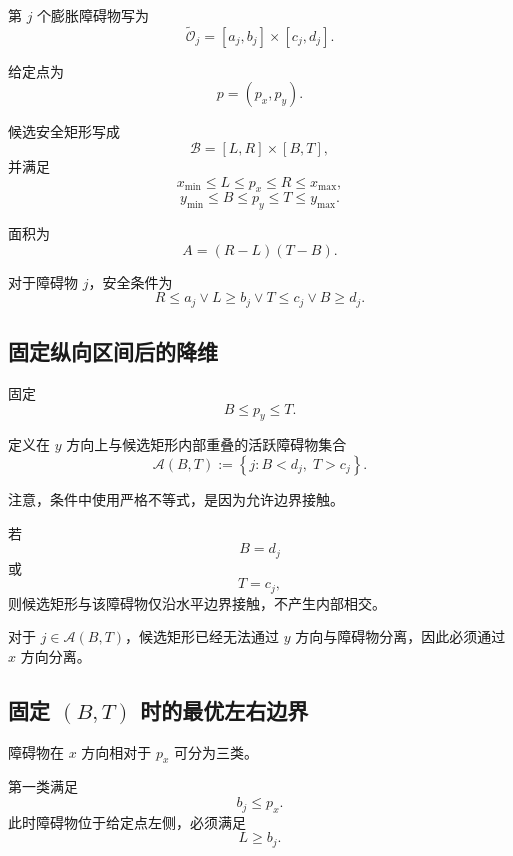 \documentclass[UTF8,12pt,a4paper]{ctexart}
\begin{document}
第 $j$ 个膨胀障碍物写为
\begin{equation}
    \widetilde{\mathcal O}_j
    =
    [a_j,b_j]\times[c_j,d_j].
\end{equation}

给定点为
\[
p=(p_x,p_y).
\]

候选安全矩形写成
\begin{equation}
    \mathcal B
    =
    [L,R]\times[B,T],
\end{equation}
并满足
\begin{equation}
    x_{\min}\le L\le p_x\le R\le x_{\max},
\end{equation}
\begin{equation}
    y_{\min}\le B\le p_y\le T\le y_{\max}.
\end{equation}

面积为
\begin{equation}
    A=(R-L)(T-B).
\end{equation}

对于障碍物 $j$，安全条件为
\begin{equation}
    R\le a_j
    \lor
    L\ge b_j
    \lor
    T\le c_j
    \lor
    B\ge d_j.
\end{equation}

\subsection{固定纵向区间后的降维}

固定
\[
B\le p_y\le T.
\]

定义在 $y$ 方向上与候选矩形内部重叠的活跃障碍物集合
\begin{equation}
    \mathcal A(B,T)
    :=
    \left\{
    j:
    B<d_j,\;
    T>c_j
    \right\}.
\end{equation}

注意，条件中使用严格不等式，是因为允许边界接触。

若
\[
B=d_j
\]
或
\[
T=c_j,
\]
则候选矩形与该障碍物仅沿水平边界接触，不产生内部相交。

对于 $j\in\mathcal A(B,T)$，候选矩形已经无法通过 $y$ 方向与障碍物分离，因此必须通过 $x$ 方向分离。

\subsection{固定 \texorpdfstring{$(B,T)$}{(B,T)} 时的最优左右边界}

障碍物在 $x$ 方向相对于 $p_x$ 可分为三类。

第一类满足
\begin{equation}
    b_j\le p_x.
\end{equation}
此时障碍物位于给定点左侧，必须满足
\begin{equation}
    L\ge b_j.
\end{equation}
\end{document}
